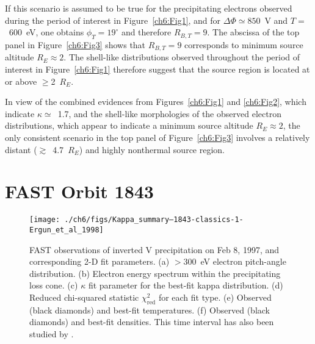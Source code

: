   If this scenario is assumed to be true for the precipitating electrons
  observed during the period of interest in Figure~\ref{ch6:Fig1}, and for
  $\Delta \Phi \simeq 850$~V and $T =$~600~eV, one obtains $\phi_T = 19^\circ$
  and therefore $R_{B,T} = 9$. The abscissa of the top panel in
  Figure~\ref{ch6:Fig3} shows that $R_{B,T} = 9$ corresponds to minimum source
  altitude $R_E \approx 2$.
  The shell-like distributions observed throughout the period of interest in
  Figure~\ref{ch6:Fig1} therefore suggest that the source region is
  located at or above $\geq$2~$R_E$.

  In view of the combined evidences from Figures~\ref{ch6:Fig1} and
  \ref{ch6:Fig2}, which indicate $\kappa \simeq$~1.7, and the shell-like
  morphologies of the observed electron distributions, which appear to indicate
  a minimum source altitude $R_E \approx 2$, the only consistent scenario in the
  top panel of Figure~\ref{ch6:Fig3} involves a relatively distant
  ($\gtrsim$~4.7~$R_E$) and highly nonthermal source region.





  
  \section{FAST Orbit 1843}


  \begin{figure}
    \centering
    \noindent\texttt{[image: ./ch6/figs/Kappa\_summary--1843-classics-1-Ergun\_et\_al\_1998]}
    \caption[Inverted V precipitation and best-fit Maxwellian and kappa
    distribution parameters (Orbit 1843)]{FAST observations of inverted V
      precipitation on Feb 8, 1997, and corresponding 2-D fit parameters. (a)
      $>$300~eV electron pitch-angle distribution. (b) Electron energy spectrum
      within the precipitating loss cone. (c) $\kappa$ fit parameter for the
      best-fit kappa distribution. (d) Reduced chi-squared statistic
      $\chi^2_{\mathrm{red}}$ for each fit type. (e) Observed (black diamonds)
      and best-fit temperatures. (f) Observed (black diamonds) and best-fit
      densities. This time interval has also been studied by
      \citet{Ergun1998a,Ergun1998}.}

    \label{ch6:Fig4}
  \end{figure}

